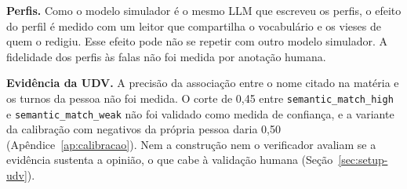 \textbf{Perfis.} Como o modelo simulador é o mesmo LLM que escreveu os perfis, o efeito do perfil é
medido com um leitor que compartilha o vocabulário e os vieses de quem o redigiu. Esse efeito pode
não se repetir com outro modelo simulador. A fidelidade dos perfis às falas não foi medida por
anotação humana.

\textbf{Evidência da UDV.} A precisão da associação entre o nome citado na matéria e os turnos da
pessoa não foi medida. O corte de 0,45 entre \texttt{semantic\_match\_high} e
\texttt{semantic\_match\_weak} não foi validado como medida de confiança, e a variante da calibração
com negativos da própria pessoa daria 0,50 (Apêndice~\ref{ap:calibracao}). Nem a construção nem o
verificador avaliam se a evidência sustenta a opinião, o que cabe à validação humana
(Seção~\ref{sec:setup-udv}).
